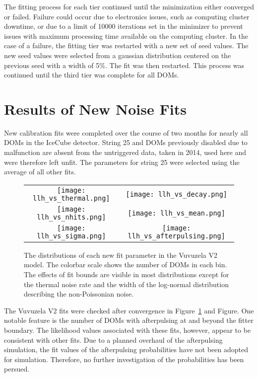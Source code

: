 The fitting process for each tier continued until the minimization either converged or failed.
Failure could occur due to electronics issues, such as computing cluster downtime, or due to a limit of 10000 iterations set in the minimizer to prevent issues with maximum processing time available on the computing cluster. 
In the case of a failure, the fitting tier was restarted with a new set of seed values.
The new seed values were selected from a gaussian distribution centered on the previous seed with a width of 5\%. 
The fit was then restarted.
This process was continued until the third tier was complete for all DOMs.

\label{sec:vuvuzela_newfits}
\section{Results of New Noise Fits}
New calibration fits were completed over the course of two months for nearly all DOMs in the IceCube detector.
String 25 and DOMs previously disabled due to malfunction are absent from the untriggered data, taken in 2014, used here and were therefore left unfit.
The parameters for string 25 were selected using the average of all other fits.


\begin{figure}[h]
\centering
\begin{tabular}{cc}
  	 \texttt{[image: llh\_vs\_thermal.png]} &
	 \texttt{[image: llh\_vs\_decay.png]} \\
 	 
 	 \texttt{[image: llh\_vs\_nhits.png]}  &
	 \texttt{[image: llh\_vs\_mean.png]} \\

	\texttt{[image: llh\_vs\_sigma.png]}  &
	\texttt{[image: llh\_vs\_afterpulsing.png]} \\
\end{tabular}
\caption{The distributions of each new fit parameter in the Vuvuzela V2 model. The colorbar scale shows the number of DOMs in each bin. The effects of fit bounds are visible in most distributions except for the thermal noise rate and the width of the log-normal distribution describing the non-Poissonian noise.}
\label{fig:vuvuzela_params_vs_llh}
\end{figure}

The Vuvuzela V2 fits were checked after convergence in Figure~\ref{fig:vuvuzela_params_vs_llh} and Figure.
One notable feature is the number of DOMs with afterpulsing at and beyond the fitter boundary.
The likelihood values associated with these fits, however, appear to be consistent with other fits.
Due to a planned overhaul of the afterpulsing simulation, the fit values of the afterpulsing probabilities have not been adopted for simulation.
Therefore, no further investigation of the probabilities has been persued.

